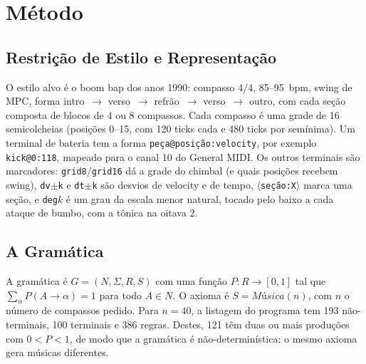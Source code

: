 \documentclass{article}
\newcommand{\nt}[1]{\textit{#1}}
\newcommand{\tm}[1]{\texttt{#1}}
\begin{document}
\section{Método}\label{sec:method}

\subsection{Restrição de Estilo e Representação}

O estilo alvo é o boom bap dos anos 1990: compasso 4/4, 85--95~bpm, swing de MPC, forma
intro~$\to$ verso~$\to$ refrão~$\to$ verso~$\to$ outro, com cada seção composta de blocos de 4 ou 8
compassos. Cada compasso é uma grade de 16 semicolcheias (posições 0--15, com 120 ticks cada e
480 ticks por semínima). Um terminal de bateria tem a forma \tm{peça@posição:velocity}, por exemplo
\tm{kick@0:118}, mapeado para o canal 10 do General MIDI. Os outros terminais são marcadores: \tm{grid8}/\tm{grid16}
dá a grade do chimbal (e quais posições recebem swing), \tm{dv$\pm$k} e \tm{dt$\pm$k} são desvios de
velocity e de tempo, \tm{$\langle$seção:X$\rangle$} marca uma seção, e \tm{deg$k$} é um grau da escala
menor natural, tocado pelo baixo a cada ataque de bumbo, com a tônica na oitava 2.

\subsection{A Gramática}

A gramática é $G=(N,\Sigma,R,S)$ com uma função $P:R\to[0,1]$ tal que
$\sum_{\alpha} P(A\to\alpha)=1$ para todo $A\in N$. O axioma é $S=\nt{Música}(n)$, com $n$ o
número de compassos pedido. Para $n=40$, a listagem do programa tem 193 não-terminais,
100 terminais e 386 regras. Destes, 121 têm duas ou mais produções com $0<P<1$, de modo que a gramática é
não-determinística: o mesmo axioma gera músicas diferentes.
\end{document}
